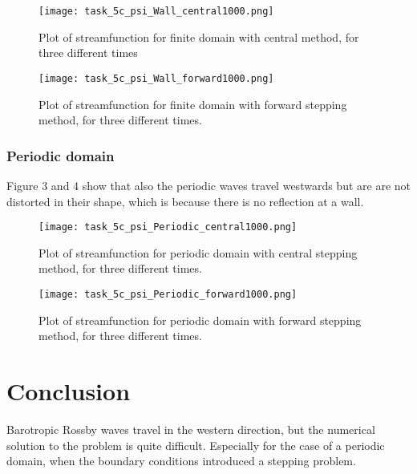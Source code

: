 \FloatBarrier
\begin{figure}[!ht]
\centering
\FloatBarrier
\texttt{[image: task\_5c\_psi\_Wall\_central1000.png]}

\caption{Plot of streamfunction for finite domain with central method, for three different times}
\label{fig:Earth_orbit_sun_Forward_Euler_k_2}
\end{figure}
\FloatBarrier


\FloatBarrier
\begin{figure}[!ht]
\centering
\FloatBarrier
\texttt{[image: task\_5c\_psi\_Wall\_forward1000.png]}

\caption{Plot of streamfunction for finite domain with forward stepping method, for three different times.}
\label{fig:Earth_orbit_sun_Forward_Euler_k_2}
\end{figure}
\FloatBarrier

\subsubsection{Periodic domain}
Figure 3 and 4 show that also the periodic waves travel westwards but are are not distorted in their shape, which is because there is no reflection at a wall.


\FloatBarrier
\begin{figure}[!ht]
\centering
\FloatBarrier
\texttt{[image: task\_5c\_psi\_Periodic\_central1000.png]}

\caption{Plot of streamfunction for periodic domain with central stepping method, for three different times.}
\label{fig:Earth_orbit_sun_Forward_Euler_k_2}
\end{figure}
\FloatBarrier


\FloatBarrier
\begin{figure}[!ht]
\centering
\FloatBarrier
\texttt{[image: task\_5c\_psi\_Periodic\_forward1000.png]}

\caption{Plot of streamfunction for periodic domain with forward stepping method, for three different times.}
\label{fig:Earth_orbit_sun_Forward_Euler_k_2}
\end{figure}
\FloatBarrier









\section{Conclusion}
Barotropic Rossby waves travel in the western direction, but the numerical solution to the problem is quite difficult. Especially for the case of a periodic domain, when the boundary conditions introduced a stepping problem. 

